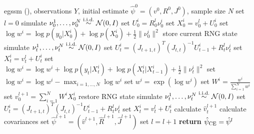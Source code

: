 \begin{algorithm}
    \begin{algorithmic}[1]
        \Require \gls{egssm} (), observations $Y$, initial estimate $\hat\psi^0 = \left( v^{0}, R^{0}, J^{0}\right)$, sample size $N$
        \State set $l = 0$
        \Repeat 
            \State simulate $\nu^{1}_0, \dots, \nu^{N}_0 \stackrel{\text{i.i.d.}}{\sim} \mathcal N(0, I)$ 
            \State set $U^{i}_0 = R^{l}_{0}\nu_{0}^{i}$ 
            \State set $X_{0}^{i} = v^{l}_{0} + U^{i}_0$ 
            \State set $\log w^{i} = \log p(y_{0}|X_{0}^{i}) + \log p(X_{0}^i) + \frac{1}{2} \lVert \nu^{i}_0\rVert^{2}$ 
            \State store current RNG state
                \State simulate $\nu^{1}_t, \dots, \nu^{N}_t \stackrel{\text{i.i.d.}}{\sim} \mathcal N(0, I)$ 
                \State set $U^{i}_t = (J_{t + 1, t})^{T}(J_{t,t})^{-1}U^{i}_{t - 1} + R^{l}_{t}\nu_{t}^{i}$ 
                \State set $X_{t}^{i} = v^{l}_{t} + U^{i}_t$ 
                \State set $\log w^{i} = \log w^{i} + \log p(y_{t}|X_{t}^{i}) + \log p(X_{t}^i|X_{t - 1}^i) + \frac{1}{2} \lVert \nu^{i}_t\rVert^{2}$ 
            \EndFor
            \State set $\log w^{i} = \log w^{i} - \max_{i = 1,\dots, N} \log w^{i}$ 
            \State set $w^{i} = \exp (\log w^{i})$
            \State set $W^{i} = \frac{w^{i}}{\sum_{i = 1}^N w^{i}}$ 
            \State set $v^{l + 1}_0 = \sum_{i = 1}^{N}W^{i}X_{0}^i$
            \State restore RNG state
                \State simulate $\nu^{1}_t, \dots, \nu^{N}_t \stackrel{\text{i.i.d.}}{\sim} \mathcal N(0, I)$ 
                \State set $U^{i}_t = (J_{t + 1, t})^{T}(J_{t,t})^{-1}U^{i}_{t - 1} + R^{l}_{t}\nu_{t}^{i}$ 
                \State set $X_{t}^{i} = v^{l}_{t} + U^{i}_t$ 
                \State calculate $\hat v^{l + 1}_{t}$ \Comment{\eqref{eq:hat_v}}
                \State calculate covariances \Comment{\eqref{eq:hat_v}}
            \EndFor
            \State set $\hat\psi^{l + 1} = \left( \hat v^{l + 1}, \hat R^{l + 1}, \hat J^{l + 1}\right)$ 
            \State set $l = l + 1$
        \State \textbf{return} ${\hat\psi_{\text{CE}}} = \hat \psi^{l}$
        
    \end{algorithmic}
    \caption{Time and space improved version of . Instructions involving the free index $i$ are to be performed for all $i = 1, \dots, N$ samples. For simplicity of notation we let $R^{l} = (R^{l}_0, \dots, R^{l}_n)$ and $J^l = (J^{l}_{0,0}, J^{l}_{1, 0}, \dots, J^{l}_{n - 1, n -1}, J^{l}_{n, n - 1} )$ for $l \in \N_{0}$.}
    \label{alg:cem-markov-proposal-fast}
\end{algorithm}

